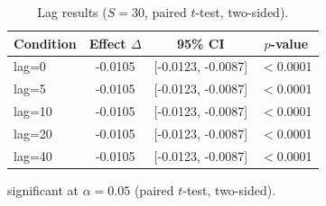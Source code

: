 \begin{table}[t]
  \centering
  \caption{Lag results ($S=30$, paired $t$-test, two-sided).}
  \label{tab:lag}
  \begin{tabular}{lccc}
    \toprule
    Condition & Effect $\Delta$ & 95\% CI & $p$-value \\
    \midrule
    lag=0 & -0.0105\dag{} & [-0.0123, -0.0087] & $<$0.0001 \\
    lag=5 & -0.0105\dag{} & [-0.0123, -0.0087] & $<$0.0001 \\
    lag=10 & -0.0105\dag{} & [-0.0123, -0.0087] & $<$0.0001 \\
    lag=20 & -0.0105\dag{} & [-0.0123, -0.0087] & $<$0.0001 \\
    lag=40 & -0.0105\dag{} & [-0.0123, -0.0087] & $<$0.0001 \\
    \bottomrule
  \end{tabular}
  \begin{minipage}{\linewidth}
    \vspace{4pt}
    \footnotesize \dag{} significant at $\alpha = 0.05$ (paired $t$-test, two-sided).
  \end{minipage}
\end{table}